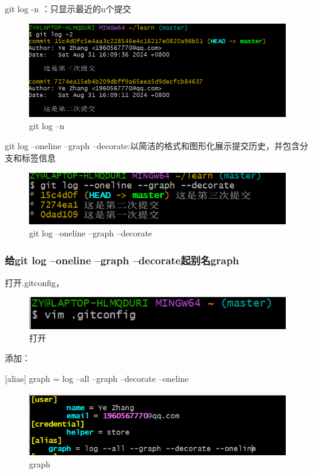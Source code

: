 \documentclass{ctexart}
\begin{document}
	git log -n ：只显示最近的n个提交
	\begin{figure}[H]
		\centering
		\includegraphics{7}
		\caption{git log --n}
	\end{figure}
	
	git log --oneline --graph --decorate:以简洁的格式和图形化展示提交历史，并包含分支和标签信息
	\begin{figure}[H]
		\centering
		\includegraphics{8}
		\caption{git log --oneline --graph --decorate}
	\end{figure}
	
	\subsubsection{给git log --oneline --graph --decorate起别名graph}
	
	打开.gitconfig，
	\begin{figure}[H]
		\centering
		\includegraphics{9}
		\caption{打开}
	\end{figure}
	
	添加：
	 
	[alias]
	graph = log --all --graph --decorate --oneline
	\begin{figure}[H]
		\centering
		\includegraphics{10}
		\caption{graph}
	\end{figure}
	
\end{document}
